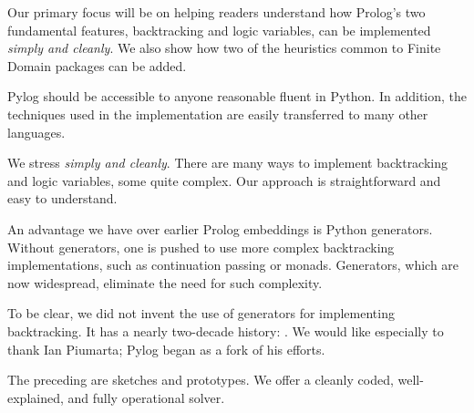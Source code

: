 Our primary focus will be on helping readers understand how Prolog's two fundamental features, backtracking and logic variables, can be implemented \textit{simply and cleanly}. We also show how two of the heuristics common to Finite Domain packages can be added. 

Pylog should be accessible to anyone reasonable fluent in Python. In addition, the techniques used in the implementation are easily transferred to many other languages. 

We stress \textit{simply and cleanly}. There are many ways to implement backtracking and logic variables, some quite complex. Our approach is straightforward and easy to understand. 

An advantage we have over earlier Prolog embeddings is Python generators. Without generators, one is pushed to use more complex backtracking implementations, such as continuation passing\cite{amin2019lightweight} or monads\cite{seres1999embedding}. Generators, which are now widespread\cite{wikipedia-generators}, eliminate the need for such complexity. 

To be clear, we did not invent the use of generators for implementing backtracking. It has a nearly two-decade history: \cite{berger2004, Bolz2007, Delford2009, Frederiksen2011, Meyers2015, Thompson2017, Santini2018, Cesar2019, Miljkovic2019}. We would like especially to thank Ian Piumarta\cite{Piumarta2017}; Pylog began as a fork of his efforts. 

The preceding are sketches and prototypes. We offer a cleanly coded, well-explained, and fully operational solver.

